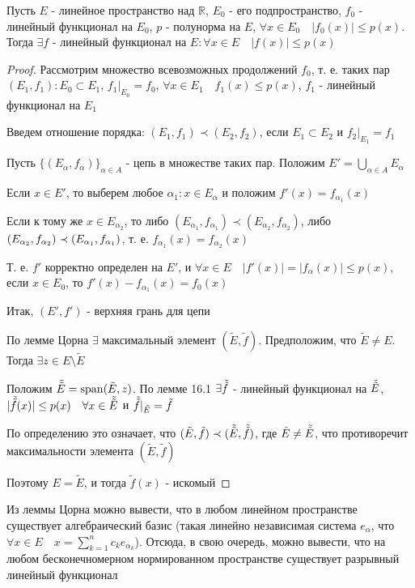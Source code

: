 \documentclass[a4paper,12pt]{report}
\newcommand*{\hm}[1]{#1\nobreak\discretionary{}%
            {\hbox{$\mathsurround=0pt #1$}}{}}
\begin{document}
\begin{thm} Пусть $E$ - линейное пространство над $\mathbb R$, $E_0$ - его подпространство, $f_0$ - линейный функционал на $E_0$, $p$ - полунорма на $E$, $\forall x\in E_0\quad|f_0(x)|\le p(x)$. Тогда $\exists f$ - линейный функционал на $E\colon\forall x\in E\quad|f(x)|\le p(x)$
\end{thm}
\begin{proof}
Рассмотрим множество всевозможных продолжений $f_0$, т. е. таких пар $(E_1,f_1)\colon E_0\subset E_1$, $f_1|_{E_0}=f_0$, $\forall x\in E_1\quad f_1(x)\le p(x)$, $f_1$ - линейный функционал на $E_1$

Введем отношение порядка: $(E_1,f_1)\prec(E_2,f_2)$, если $E_1\subset E_2$ и $f_2|_{E_1}=f_1$

Пусть $\{(E_\alpha,f_\alpha)\}_{\alpha\in A}$ - цепь в множестве таких пар. Положим $E'=\bigcup\limits_{\alpha\in A}E_\alpha$

Если $x\in E'$, то выберем любое $\alpha_1\colon x\in E_\alpha$ и положим $f'(x)=f_{\alpha_1}(x)$

Если к тому же $x\in E_{\alpha_2}$, то либо $(E_{\alpha_1},f_{\alpha_1})\prec(E_{\alpha_2},f_{\alpha_2})$, либо $(E_{\alpha_2},f_{\alpha_2})\hm\prec(E_{\alpha_1},f_{\alpha_1})$, т. е. $f_{\alpha_1}(x)=f_{\alpha_2}(x)$

Т. е. $f'$ корректно определен на $E'$, и $\forall x\in E\quad|f'(x)|=|f_\alpha(x)|\le p(x)$, если $x\in E_0$, то $f'(x)-f_{\alpha_1}(x)=f_0(x)$

Итак, $(E',f')$ - верхняя грань для цепи

По лемме Цорна $\exists$ максимальный элемент $(\tilde E,\tilde f)$. Предположим, что $\tilde E\ne E$. Тогда $\exists z\in E\setminus\tilde E$

Положим $\Tilde{\tilde E}=\mathrm{span}(\tilde E,z)$. По лемме 16.1 $\exists \Tilde{\tilde f}$ - линейный функционал на $\Tilde{\tilde E}$, $|\Tilde{\tilde f}(x)|\le p(x)\quad\forall x\in\Tilde{\tilde E}$ и $\Tilde{\tilde f}|_{\tilde E}=\tilde f$

По определению это означает, что $(\tilde E,\tilde f)\prec(\Tilde{\tilde E},\Tilde{\tilde f})$, где $\tilde E\ne\Tilde{\tilde E}$, что противоречит максимальности элемента $(\tilde E,\tilde f)$

Поэтому $E=\tilde E$, и тогда $\tilde f(x)$ - искомый
\end{proof}
 


\begin{rem}
Из леммы Цорна можно вывести, что в любом линейном пространстве существует алгебраический базис (такая линейно независимая система ${e_\alpha}$, что $\forall x\in E\quad x=\sum\limits_{k=1}^n c_k e_{\alpha_k}$). Отсюда, в свою очередь, можно вывести, что на любом бесконечномерном нормированном пространстве существует разрывный линейный функционал
\end{rem}
 
\end{document}
